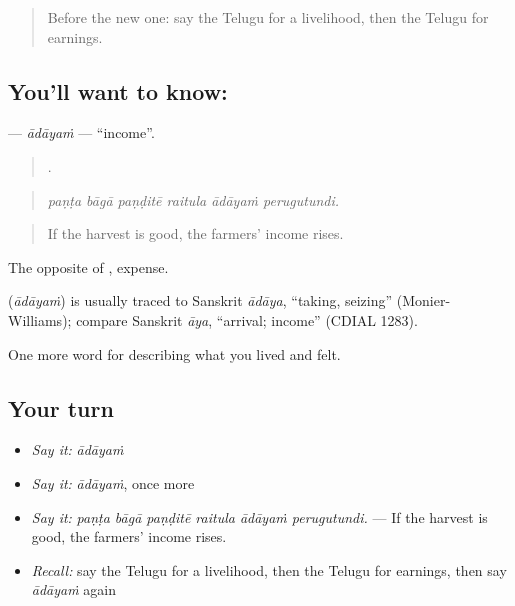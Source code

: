\label{lesson:TE-C525-adayam}



\begin{quote}
Before the new one: say the Telugu for a livelihood, then the Telugu for earnings.
\end{quote}

\subsection*{You'll want to know: }
\textbf{} — \emph{ādāyaṁ} — \textquotedblleft{}income\textquotedblright{}.

\begin{quote}
     .
\end{quote}

\begin{quote}
\emph{paṇṭa bāgā paṇḍitē raitula ādāyaṁ perugutundi.}
\end{quote}

\begin{quote}
If the harvest is good, the farmers' income rises.
\end{quote}

The opposite of , expense.

\begin{cousinweb}
\textbf{} (\emph{ādāyaṁ}) is usually traced to Sanskrit \emph{ādāya}, \textquotedblleft{}taking, seizing\textquotedblright{} (Monier-Williams); compare Sanskrit \emph{āya}, \textquotedblleft{}arrival; income\textquotedblright{} (CDIAL 1283).
\end{cousinweb}

\begin{grammarlens}[title={What you've built}]
One more word for describing what you lived and felt.
\end{grammarlens}

\subsection*{Your turn}
\begin{itemize}
\raggedright
  \item \emph{Say it:} \emph{ādāyaṁ}
  \item \emph{Say it:} \emph{ādāyaṁ}, once more
  \item \emph{Say it:} \emph{paṇṭa bāgā paṇḍitē raitula ādāyaṁ perugutundi.} — If the harvest is good, the farmers' income rises.
  \item \emph{Recall:} say the Telugu for a livelihood, then the Telugu for earnings, then say \emph{ādāyaṁ} again
\end{itemize}

